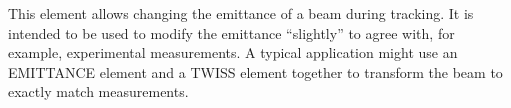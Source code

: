 This element allows changing the  emittance of a beam during tracking.
It  is intended to  be used  to modify  the emittance  ``slightly'' to
agree  with,  for   example,  experimental  measurements.   A  typical
application  might  use  an  EMITTANCE  element and  a  TWISS  element
together to transform the beam to exactly match measurements.
